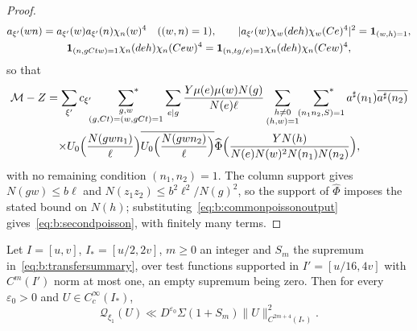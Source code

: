 \begin{proof}
\[
  \begin{gathered}
  a_{\xi'}(wn)=a_{\xi'}(w)a_{\xi'}(n)\chi_n(w)^4\quad((w,n)=1),\qquad|a_{\xi'}(w)\chi_w(deh)\chi_w(Ce)^4|^2=\mathbf{1}_{(w,h)=1},\\
  \mathbf{1}_{(n,gCtw)=1}\chi_n(deh)\chi_n(Cew)^4=\mathbf{1}_{(n,tg/e)=1}\chi_n(deh)\chi_n(Cew)^4,
  \end{gathered}
\]
so that
\begin{multline*}
  \mathcal M-Z=\sum_{\xi'}c_{\xi'}\sideset{}{^*}\sum_{\substack{g,w\\(g,Ct)=(w,gCt)=1}}\sum_{e\mid g}\frac{Y\mu(e)\mu(w)N(g)}{N(e)\ell}\sum_{\substack{h\ne0\\(h,w)=1}}\sideset{}{^*}\sum_{(n_1n_2,S)=1}a^\sharp(n_1)\overline{a^\sharp(n_2)}\\
  \times U_0\Bigl(\frac{N(gwn_1)}\ell\Bigr)\overline{U_0\Bigl(\frac{N(gwn_2)}\ell\Bigr)}\widehat\Phi\Bigl(\frac{YN(h)}{N(e)N(w)^2N(n_1)N(n_2)}\Bigr),
\end{multline*}
with no remaining condition $(n_1,n_2)=1$. The column support gives $N(gw)\le b\ell$ and $N(z_1z_2)\le b^2\ell^2/N(g)^2$, so the support of $\widehat\Phi$ imposes the stated bound on $N(h)$; substituting~\eqref{eq:b:commonpoissonoutput} gives~\eqref{eq:b:secondpoisson}, with finitely many terms.
\end{proof}

\begin{lemma}\label{lem:b:secondtransfer}
Let $I=[u,v]$, $I_*=[u/2,2v]$, $m\ge0$ an integer and $S_m$ the supremum in~\eqref{eq:b:transfersummary}, over test functions supported in $I'=[u/16,4v]$ with $C^m(I')$ norm at most one, an empty supremum being zero. Then for every $\varepsilon_0>0$ and $U\in C_c^\infty(I_*)$,
\[
  \mathcal Q_{\xi_1}(U)\ll D^{\varepsilon_0}\Sigma(1+S_m)\|U\|^2_{C^{2m+4}(I_*)}.
\]
\end{lemma}

